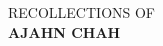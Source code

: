 
\vspace*{5em}

{\raggedleft

\begin{minipage}{0.7\textwidth}
\partTitleFont\Huge RECOLLECTIONS OF\\
\color[gray]{0.6}\textbf{AJAHN CHAH}
\end{minipage}

}

